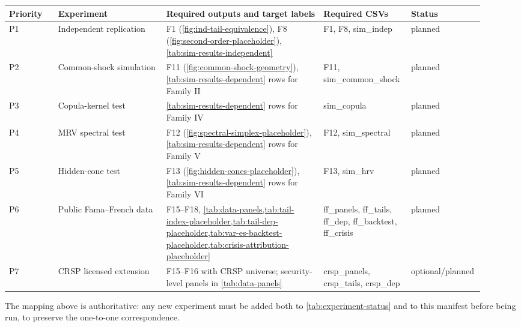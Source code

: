 \begin{longtable}{p{0.10\linewidth}p{0.22\linewidth}p{0.32\linewidth}p{0.16\linewidth}p{0.12\linewidth}}
\toprule
Priority & Experiment & Required outputs and target labels & Required CSVs & Status \\
\midrule
\endhead
P1 & Independent replication &
F1 (\cref{fig:ind-tail-equivalence}), F8 (\cref{fig:second-order-placeholder}), \cref{tab:sim-results-independent} &
F1, F8, sim\_indep & planned \\
P2 & Common-shock simulation &
F11 (\cref{fig:common-shock-geometry}), \cref{tab:sim-results-dependent} rows for Family II &
F11, sim\_common\_shock & planned \\
P3 & Copula-kernel test &
\cref{tab:sim-results-dependent} rows for Family IV &
sim\_copula & planned \\
P4 & MRV spectral test &
F12 (\cref{fig:spectral-simplex-placeholder}), \cref{tab:sim-results-dependent} rows for Family V &
F12, sim\_spectral & planned \\
P5 & Hidden-cone test &
F13 (\cref{fig:hidden-cones-placeholder}), \cref{tab:sim-results-dependent} rows for Family VI &
F13, sim\_hrv & planned \\
P6 & Public Fama--French data &
F15--F18, \cref{tab:data-panels,tab:tail-index-placeholder,tab:tail-dep-placeholder,tab:var-es-backtest-placeholder,tab:crisis-attribution-placeholder} &
ff\_panels, ff\_tails, ff\_dep, ff\_backtest, ff\_crisis & planned \\
P7 & CRSP licensed extension &
F15--F16 with CRSP universe; security-level panels in \cref{tab:data-panels} &
crsp\_panels, crsp\_tails, crsp\_dep & optional/planned \\
\bottomrule
\end{longtable}

The mapping above is authoritative: any new experiment must be added both to
\cref{tab:experiment-status} and to this manifest before being run, to
preserve the one-to-one correspondence.
